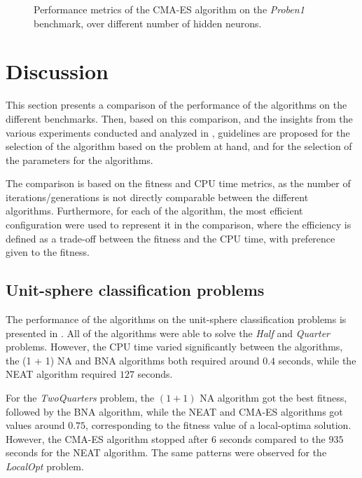 \begin{figure}
\begin{center}
    \end{center}
    \caption{Performance metrics of the CMA-ES algorithm on the \textit{Proben1} benchmark, over different number of hidden neurons.}
    \label{fig:cmaes_proben1}
\end{figure}

\section{Discussion}

This section presents a comparison of the performance of the algorithms on the different benchmarks.
Then, based on this comparison, and the insights from the various experiments conducted and analyzed in , guidelines are proposed for the selection of the algorithm
based on the problem at hand, and for the selection of the parameters for the algorithms.

The comparison is based on the fitness and CPU time metrics, as the number of iterations/generations is not directly comparable between the different algorithms.
Furthermore, for each of the algorithm, the most efficient configuration were used to represent it in the comparison, where the efficiency is defined as a trade-off between the fitness
and the CPU time, with preference given to the fitness.

\subsection{Unit-sphere classification problems}

The performance of the algorithms on the unit-sphere classification problems is presented in .
All of the algorithms were able to solve the \textit{Half} and \textit{Quarter} problems.  However, the CPU time varied significantly between the algorithms, the (1 + 1) NA and BNA algorithms
both required around $0.4$ seconds, while the NEAT algorithm required $127$ seconds.

For the \textit{TwoQuarters} problem, the $(1 + 1)$ NA algorithm got the best fitness, followed by the BNA algorithm, while the NEAT and CMA-ES algorithms got values around $0.75$,
corresponding to the fitness value of a local-optima solution. However, the CMA-ES algorithm stopped after $6$ seconds compared to the $935$ seconds for the NEAT algorithm.
The same patterns were observed for the \textit{LocalOpt} problem.

